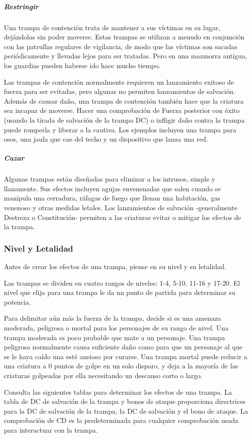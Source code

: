 \documentclass[a4paper,twocolumn,openany,10pt]{dndbook}
\begin{document}
\subparagraph{Restringir} Una trampa de contención trata de mantener a sus víctimas en su lugar, dejándolas sin poder moverse.
Estas trampas se utilizan a menudo en conjunción con las patrullas regulares de vigilancia, de modo que las víctimas son sacadas
periódicamente y llevadas lejos para ser tratadas. Pero en una mazmorra antigua, los guardias pueden haberse ido hace mucho
tiempo.

Las trampas de contención normalmente requieren un lanzamiento exitoso de fuerza para ser evitadas, pero algunas no permiten
lanzamientos de salvación. Además de causar daño, una trampa de contención también hace que la criatura sea incapaz de moverse.
Hacer una comprobación de Fuerza posterior con éxito (usando la tirada de salvación de la trampa DC) o infligir daño contra la
trampa puede romperla y liberar a la cautiva. Los ejemplos incluyen una trampa para osos, una jaula que cae del techo y un
dispositivo que lanza una red. 

\subparagraph{Cazar} Algunas trampas están diseñadas para eliminar a los intrusos, simple y llanamente. Sus efectos incluyen
agujas envenenadas que salen cuando se manipula una cerradura, ráfagas de fuego que llenan una habitación, gas venenoso y otras
medidas letales. Los lanzamientos de salvación -generalmente Destreza o Constitución- permiten a las criaturas evitar o mitigar
los efectos de la trampa.

\subsubsection*{Nivel y Letalidad}
Antes de crear los efectos de una trampa, piense en su nivel y su letalidad.

Las trampas se dividen en cuatro rangos de niveles: 1-4, 5-10, 11-16 y 17-20. El nivel que elija para una trampa le da un punto
de partida para determinar su potencia.

Para delimitar aún más la fuerza de la trampa, decide si es una amenaza moderada, peligrosa o mortal para los personajes de su
rango de nivel. Una trampa moderada es poco probable que mate a un personaje. Una trampa peligrosa normalmente causa suficiente
daño como para que un personaje al que se le haya caído una esté ansioso por curarse. Una trampa mortal puede reducir a una
criatura a 0 puntos de golpe en un solo disparo, y deja a la mayoría de las criaturas golpeadas por ella necesitando un descanso
corto o largo.

Consulta las siguientes tablas para determinar los efectos de una trampa. La tabla de DC de salvación de la trampa y bonos de
ataque proporciona directrices para la DC de salvación de la trampa, la DC de salvación y el bono de ataque. La comprobación de
CD es la predeterminada para cualquier comprobación usada para interactuar con la trampa.
\end{document}
